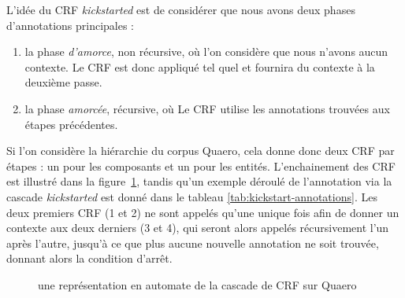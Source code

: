 \documentclass[PhD-Yoann-Dupont.tex]{subfiles}
\begin{document}
L'idée du CRF \textit{kickstarted} est de considérer que nous avons deux phases d'annotations principales :

\begin{enumerate}
    \item la phase \emph{d'amorce}, non récursive, où l'on considère que nous n'avons aucun contexte. Le CRF est donc appliqué tel quel et fournira du contexte à la deuxième passe.
    \item la phase \emph{amorcée}, récursive, où Le CRF utilise les annotations trouvées aux étapes précédentes.
\end{enumerate}

Si l'on considère la hiérarchie du corpus Quaero, cela donne donc deux CRF par étapes : un pour les composants et un pour les entités. L'enchainement des CRF est illustré dans la figure\ \ref{fig:kickstart-automaton}, tandis qu'un exemple déroulé de l'annotation via la cascade \textit{kickstarted} est donné dans le tableau \ref{tab:kickstart-annotations}. Les deux premiers CRF (1 et 2) ne sont appelés qu'une unique fois afin de donner un contexte aux deux derniers (3 et 4), qui seront alors appelés récursivement l'un après l'autre, jusqu'à ce que plus aucune nouvelle annotation ne soit trouvée, donnant alors la condition d'arrêt.

\begin{figure}[ht!]
\centering
{}
\caption{une représentation en automate de la cascade de CRF sur Quaero}
\label{fig:kickstart-automaton}
\end{figure}
\end{document}
